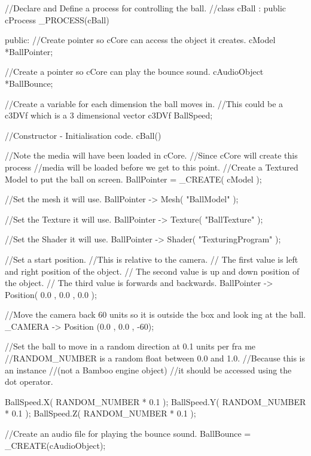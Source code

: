 \begin{DoxyCode}
//Declare and Define a process for controlling the ball.
//class cBall : public cProcess
 _PROCESS(cBall)
 {
 public:
 //Create pointer so cCore can  access the object it creates.
 cModel *BallPointer;

 //Create a pointer so cCore can play the bounce sound.
 cAudioObject *BallBounce;

 //Create a variable for each dimension the ball moves in.
 //This could be a c3DVf which is a 3 dimensional vector
 c3DVf BallSpeed;

  //Constructor - Initialisation code.
        cBall()
        {
                //Note the media will have been loaded in cCore.
                //Since cCore will create this process
                //media will be loaded before we get to this point.
                //Create a Textured Model to put the ball on screen.
        BallPointer =  _CREATE( cModel );

                //Set the mesh it will use.
        BallPointer -> Mesh( "BallModel" );

                //Set the Texture it will use.
        BallPointer -> Texture( "BallTexture" );

                //Set the Shader it will use.
        BallPointer -> Shader( "TexturingProgram" );

                //Set a start position.
                //This is relative to the camera.
                // The first value is left and right position of the object.
                // The second value is up and down position of the object.
                // The third value is forwards and backwards.
        BallPointer -> Position( 0.0 , 0.0 , 0.0 );

                //Move the camera back 60 units so it is outside the box and look
      ing at the ball.
        _CAMERA -> Position (0.0 , 0.0 , -60);

                //Set the ball to move in a random direction at 0.1 units per fra
      me
                //RANDOM_NUMBER is a random float between 0.0 and 1.0.
                //Because this is an instance
                //(not a Bamboo engine object)
                //it should be accessed using the dot operator.

        BallSpeed.X( RANDOM_NUMBER * 0.1 );
        BallSpeed.Y( RANDOM_NUMBER * 0.1 );
        BallSpeed.Z( RANDOM_NUMBER * 0.1 );

        //Create an audio file for playing the bounce sound.
        BallBounce = _CREATE(cAudioObject);

}}
\end{DoxyCode}
